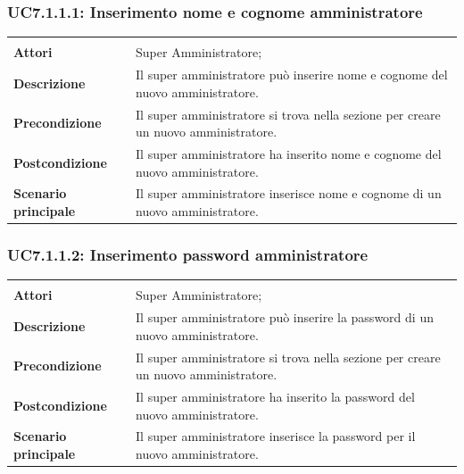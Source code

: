 \subsubsection{UC7.1.1.1: Inserimento nome e cognome amministratore}
\label{UC7.1.1.1}
\begin{longtable}{l|p{10cm}}
\hline
&\\
\textbf{Attori} & Super Amministratore;\\[7pt]
\textbf{Descrizione} & Il super amministratore può inserire nome e cognome del nuovo amministratore.\\[7pt]
\textbf{Precondizione} & Il super amministratore si trova nella sezione per creare un nuovo amministratore. \\[7pt]
\textbf{Postcondizione} & Il super amministratore ha inserito nome e cognome del nuovo amministratore.\\[7pt]
\textbf{Scenario principale} & Il super amministratore inserisce nome e cognome di un nuovo amministratore.\\[7pt]\hline
\end{longtable}

\subsubsection{UC7.1.1.2: Inserimento password amministratore}
\label{UC7.1.1.2}
\begin{longtable}{l|p{10cm}}
\hline
&\\
\textbf{Attori} & Super Amministratore;\\[7pt]
\textbf{Descrizione} & Il super amministratore può inserire la password di un nuovo amministratore.\\[7pt]
\textbf{Precondizione} & Il super amministratore si trova nella sezione per creare un nuovo amministratore. \\[7pt]
\textbf{Postcondizione} & Il super amministratore ha inserito la password del nuovo amministratore.\\[7pt]
\textbf{Scenario principale} & Il super amministratore inserisce la password per il nuovo amministratore.\\[7pt]\hline
\end{longtable}


